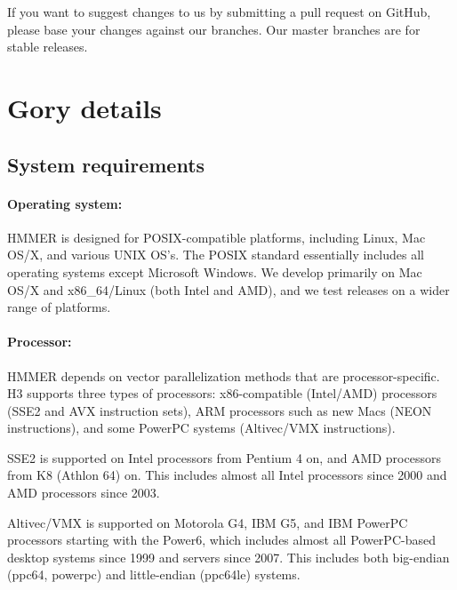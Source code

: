 If you want to suggest changes to us by submitting a pull request on
GitHub, please base your changes against our  branches.
Our master branches are for stable releases.



\section{Gory details}

\subsection{System requirements}

\paragraph{Operating system:} HMMER is designed for
POSIX-compatible platforms, including Linux, Mac OS/X, and various
UNIX OS's. The POSIX standard essentially includes all operating
systems except Microsoft Windows.  We develop primarily on Mac OS/X and x86\_64/Linux
(both Intel and AMD), and we test releases on a wider range of
platforms.
  
\paragraph{Processor:} HMMER depends on vector parallelization methods
that are processor-specific. H3 supports three types of processors:
x86-compatible (Intel/AMD) processors (SSE2 and AVX instruction sets),
ARM processors such as new Macs (NEON instructions), and some PowerPC
systems (Altivec/VMX instructions).

SSE2 is supported on Intel processors from Pentium 4 on, and AMD
processors from K8 (Athlon 64) on. This includes almost all Intel
processors since 2000 and AMD processors since 2003.

Altivec/VMX is supported on Motorola G4, IBM G5, and IBM PowerPC
processors starting with the Power6, which includes almost all
PowerPC-based desktop systems since 1999 and servers since
2007. This includes both big-endian (ppc64, powerpc) and
little-endian (ppc64le) systems.

